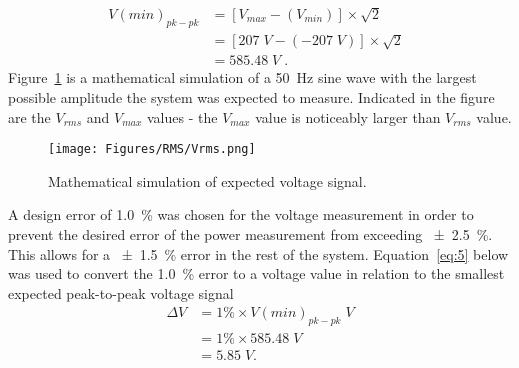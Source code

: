     \begin{equation}
    \label{eq:4}
    \begin{split}
    V(min)_{pk-pk} &= [V_{max} - (V_{min})] \times \sqrt{2} \;\;\\
              &= [207 \; V - (-207 \; V)] \times \sqrt{2} \;\;\\
              &= 585.48 \; V \; .
    \end{split}
    \end{equation}
Figure~\ref{fig:Volt_sim} is a mathematical simulation of a \qty{50}{\hertz} sine wave with the largest possible amplitude the system was expected to measure. Indicated in the figure are the $V_{rms}$ and $V_{max}$ values - the $V_{max}$ value is noticeably larger than $V_{rms}$ value.
\begin{figure}[H]
    \centering
    \texttt{[image: Figures/RMS/Vrms.png]}
    \caption{Mathematical simulation of expected voltage signal.}
    \label{fig:Volt_sim}
\end{figure}
A design error of \qty{1.0}{\percent} was chosen for the voltage measurement in order to prevent the desired error of the power measurement from exceeding \qty{\pm 2.5}{\percent}. This allows for a \qty{\pm 1.5}{\percent} error in the rest of the system. Equation~\ref{eq:5} below was used to convert the \qty{1.0}{\percent} error to a voltage value in relation to the smallest expected peak-to-peak voltage signal 
\begin{equation}
\label{eq:5}
\begin{split}
    \Delta V &= 1\% \times V(min)_{pk-pk} \; V \\
             &= 1\% \times  585.48\; V \\
             &= 5.85 \; V .
\end{split}
\end{equation}

